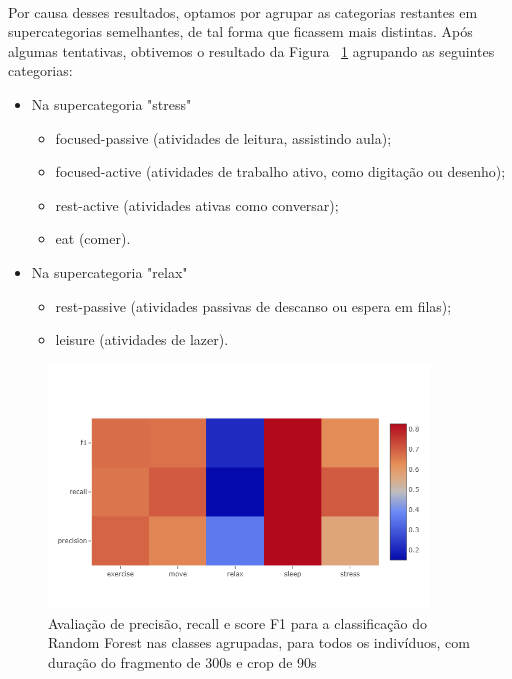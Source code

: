             \paragraph{} Por causa desses resultados, optamos por agrupar as categorias restantes em supercategorias semelhantes, de tal forma que ficassem mais distintas. Após algumas tentativas, obtivemos o resultado da Figura ~\ref{group2} agrupando as seguintes categorias:
            \begin{itemize} 
                \item Na supercategoria "stress"
                \begin{itemize} 
                    \item focused-passive (atividades de leitura, assistindo aula);
                    \item focused-active (atividades de trabalho ativo, como digitação ou desenho);
                    \item rest-active (atividades ativas como conversar);
                    \item eat (comer).
                \end{itemize}
                \item Na supercategoria "relax"
                \begin{itemize} 
                    \item rest-passive (atividades passivas de descanso ou espera em filas);
                    \item leisure (atividades de lazer).
                \end{itemize}
            \end{itemize}
            
            \begin{figure}[h!]
            	\centering
            	\includegraphics[width=0.9\textwidth]{Figures/classif/class_group2.png}
            	\caption{Avaliação de precisão, recall e score F1 para a classificação do Random Forest nas classes agrupadas, para todos os indivíduos, com duração do fragmento de  300s e crop de 90s}
                \label{group2}
            \end{figure}
            
